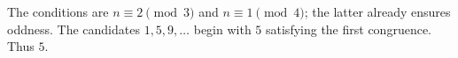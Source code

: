 The conditions are $n\equiv2\pmod3$ and $n\equiv1\pmod4$; the latter already ensures oddness. The candidates $1,5,9,\ldots$ begin with $5$ satisfying the first congruence. Thus $\boxed5$.
